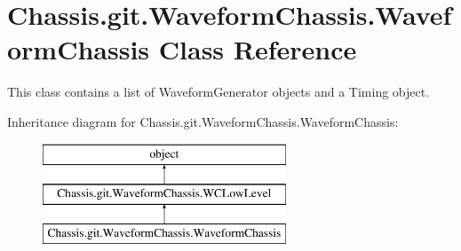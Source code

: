\hypertarget{class_chassis_8git_1_1_waveform_chassis_1_1_waveform_chassis}{\section{Chassis.\-git.\-Waveform\-Chassis.\-Waveform\-Chassis Class Reference}
\label{class_chassis_8git_1_1_waveform_chassis_1_1_waveform_chassis}
}


This class contains a list of Waveform\-Generator objects and a Timing object.  


Inheritance diagram for Chassis.\-git.\-Waveform\-Chassis.\-Waveform\-Chassis\-:\begin{figure}[H]
\begin{center}
\leavevmode
\includegraphics[height=3.000000cm]{class_chassis_8git_1_1_waveform_chassis_1_1_waveform_chassis}
\end{center}
\end{figure}
